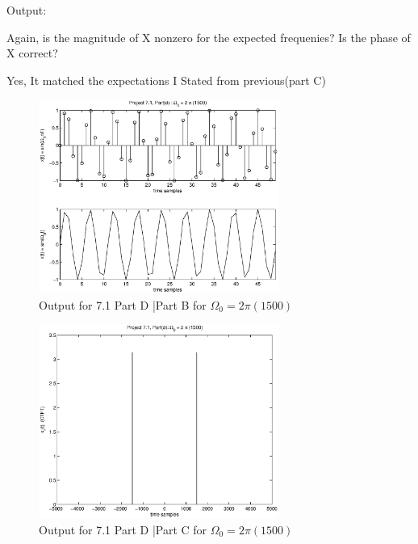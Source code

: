 {\LARGE Output:}

Again, is the magnitude of X nonzero for the expected frequenies? Is the phase of X correct?

Yes, It matched the expectations I Stated from previous(part C)

\begin{figure}[!htbp]
  \centering
    \includegraphics[width=0.7\textwidth]{Part1/Output/Figures/proj71PartD1.eps}
  \caption{Output for 7.1 Part D |Part B for $\Omega_0 = 2\pi(1500)$ }
\end{figure}

\begin{figure}[!htbp]
  \centering
    \includegraphics[width=0.7\textwidth]{Part1/Output/Figures/proj71PartD2.eps}
  \caption{Output for 7.1 Part D |Part C for $\Omega_0 = 2\pi(1500)$ }
\end{figure}


